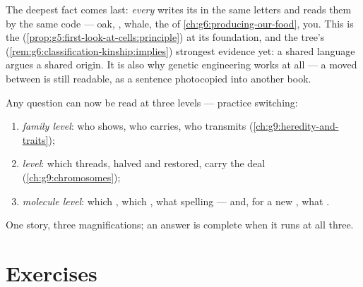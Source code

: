 \begin{remark}\label{rem:g9:genes-and-dna:universal}
The deepest fact comes last: \emph{every} 
writes its  in the same  letters and reads them by
the same code --- oak, , whale, the  of
\cref{ch:g6:producing-our-food}, you. This is the  (\cref{prop:g5:first-look-at-cells:principle}) at its
foundation, and the  tree's
(\cref{rem:g6:classification-kinship:implies}) strongest
evidence yet: a shared language argues a shared origin.
It is also why genetic engineering works at all --- a 
moved between  is still readable, as a sentence
photocopied into another book.
\end{remark}

\begin{method}\label{met:g9:genes-and-dna:levels}
Any  question can now be read at three levels ---
practice switching:
\begin{enumerate}
  \item \emph{family level}: who shows, who carries, who
        transmits (\cref{ch:g9:heredity-and-traits});
  \item \emph{ level}: which threads, halved and
        restored, carry the deal
        (\cref{ch:g9:chromosomes});
  \item \emph{molecule level}: which , which ,
        what spelling --- and, for a new , what
        .
\end{enumerate}
One story, three magnifications; an answer is complete
when it runs at all three.
\end{method}

\section{Exercises}

